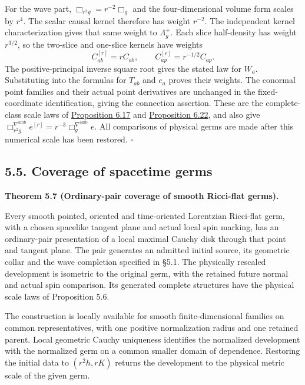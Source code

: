 \documentclass[
  english,
  11pt,
  reqno]{amsart}
\makeatletter
\newcommand{\pandocstatementheading}[1]{%
  \par\addpenalty{\@beginparpenalty}%
  \addvspace{.5\baselineskip plus .2\baselineskip minus .2\baselineskip}%
  {\normalfont\bfseries #1\par}%
  \nobreak\@afterindenttrue\@afterheading
}
\makeatother
\begin{document}
For the wave part, \(\Box_{r^2g}=r^{-2}\Box_g\) and the four-dimensional
volume form scales by \(r^4\). The scalar causal kernel therefore has
weight \(r^{-2}\). The independent kernel characterization gives that
same weight to \(\Lambda_g^+\). Each slice half-density has weight
\(r^{3/2}\), so the two-slice and one-slice kernels have weights \[
C_{ab}^{[r]}=rC_{ab},
\qquad
C_{ap}^{[r]}=r^{-1/2}C_{ap}.
\] The positive-principal inverse square root gives the stated law for
\(W_a\). Substituting into the formulas for \(T_{ab}\) and \(e_a\)
proves their weights. The conormal point families and their actual point
derivatives are unchanged in the fixed-coordinate identification, giving
the connection assertion. These are the complete-class scale laws of
\hyperref[prop:online-wave-carrier-families-scale]{Proposition 6.17} and
\hyperref[prop:online-point-connection-finite-families]{Proposition
6.22}, and also give \(\Box_{r^2g}^{\nabla^{\mathrm{amb}}}e^{[r]}
=r^{-3}\Box_g^{\nabla^{\mathrm{amb}}}e\). All comparisons of physical
germs are made after this numerical scale has been restored.
\hfill\(\square\)

\subsection{5.5. Coverage of spacetime
germs}\label{coverage-of-spacetime-germs}\label{sec:submission-spacetime-coverage}

\pandocstatementheading{\leavevmode{}\label{thm:submission-vacuum-germ-coverage}Theorem 5.7 (Ordinary-pair coverage of smooth Ricci-flat germs).}

Every smooth pointed, oriented and time-oriented Lorentzian Ricci-flat
germ, with a chosen spacelike tangent plane and actual local spin
marking, has an ordinary-pair presentation of a local maximal Cauchy
disk through that point and tangent plane. The pair generates an
admitted initial source, its geometric collar and the wave completion
specified in §5.1. The physically rescaled development is isometric to
the original germ, with the retained future normal and actual spin
comparison. Its generated complete structures have the physical scale
laws of Proposition 5.6.

The construction is locally available for smooth finite-dimensional
families on common representatives, with one positive normalization
radius and one retained parent. Local geometric Cauchy uniqueness
identifies the normalized development with the normalized germ on a
common smaller domain of dependence. Restoring the initial data to
\((r^2h,rK)\) returns the development to the physical metric scale of
the given germ.
\end{document}
